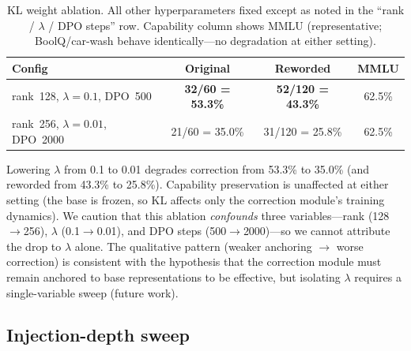 \documentclass[11pt]{article}
\begin{document}
\begin{table}[ht]
\centering
\small
\caption{KL weight ablation. All other hyperparameters fixed except as noted in the ``rank / $\lambda$ / DPO steps'' row. Capability column shows MMLU (representative; BoolQ/car-wash behave identically---no degradation at either setting).}
\begin{tabular}{@{}lccc@{}}
\toprule
Config & Original & Reworded & MMLU \\
\midrule
rank~128, $\lambda{=}0.1$, DPO~500 & \textbf{32/60 = 53.3\%} & \textbf{52/120 = 43.3\%} & 62.5\% \\
rank~256, $\lambda{=}0.01$, DPO~2000 & 21/60 = 35.0\% & 31/120 = 25.8\% & 62.5\% \\
\bottomrule
\end{tabular}
\label{tab:kl}
\end{table}

Lowering $\lambda$ from 0.1 to 0.01 degrades correction from 53.3\% to 35.0\% (and reworded from 43.3\% to 25.8\%).
Capability preservation is unaffected at either setting (the base is frozen, so KL affects only the correction module's training dynamics).
We caution that this ablation \emph{confounds} three variables---rank (128$\to$256), $\lambda$ (0.1$\to$0.01), and DPO steps (500$\to$2000)---so we cannot attribute the drop to $\lambda$ alone.
The qualitative pattern (weaker anchoring $\to$ worse correction) is consistent with the hypothesis that the correction module must remain anchored to base representations to be effective, but isolating $\lambda$ requires a single-variable sweep (future work).

\subsection{Injection-depth sweep}
\label{sec:depth}
\end{document}
